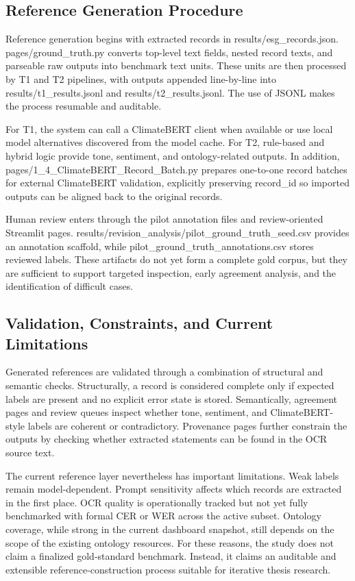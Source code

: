\documentclass[english, online, cse, master]{dithesis}
\begin{document}
\subsection{Reference Generation Procedure}

Reference generation begins with extracted records in results/esg\_records.json. pages/ground\_truth.py converts top-level text fields, nested record texts, and parseable raw outputs into benchmark text units. These units are then processed by T1 and T2 pipelines, with outputs appended line-by-line into results/t1\_results.jsonl and results/t2\_results.jsonl. The use of JSONL makes the process resumable and auditable.

For T1, the system can call a ClimateBERT client when available or use local model alternatives discovered from the model cache. For T2, rule-based and hybrid logic provide tone, sentiment, and ontology-related outputs. In addition, pages/1\_4\_ClimateBERT\_Record\_Batch.py prepares one-to-one record batches for external ClimateBERT validation, explicitly preserving record\_id so imported outputs can be aligned back to the original records.

Human review enters through the pilot annotation files and review-oriented Streamlit pages. results/revision\_analysis/pilot\_ground\_truth\_seed.csv provides an annotation scaffold, while pilot\_ground\_truth\_annotations.csv stores reviewed labels. These artifacts do not yet form a complete gold corpus, but they are sufficient to support targeted inspection, early agreement analysis, and the identification of difficult cases.

\subsection{Validation, Constraints, and Current Limitations}

Generated references are validated through a combination of structural and semantic checks. Structurally, a record is considered complete only if expected labels are present and no explicit error state is stored. Semantically, agreement pages and review queues inspect whether tone, sentiment, and ClimateBERT-style labels are coherent or contradictory. Provenance pages further constrain the outputs by checking whether extracted statements can be found in the OCR source text.

The current reference layer nevertheless has important limitations. Weak labels remain model-dependent. Prompt sensitivity affects which records are extracted in the first place. OCR quality is operationally tracked but not yet fully benchmarked with formal CER or WER across the active subset. Ontology coverage, while strong in the current dashboard snapshot, still depends on the scope of the existing ontology resources. For these reasons, the study does not claim a finalized gold-standard benchmark. Instead, it claims an auditable and extensible reference-construction process suitable for iterative thesis research.
\end{document}
